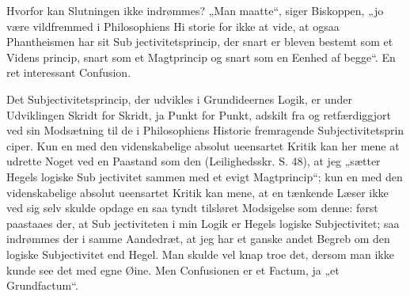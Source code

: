 \documentclass[12pt]{book}
\newcommand{\opage}[1]{\marginnote{\footnotesize\textit{[#1]}}}
\begin{document}
Hvorfor kan Slutningen ikke indrømmes? „Man maatte“,
siger Biskoppen, „jo være vildfremmed i Philosophiens Hi\-%
storie for ikke at vide, at ogsaa Phantheismen har sit Sub\-%
jectivitetsprincip, der snart er bleven bestemt som et Videns\-%
princip, snart som et Magtprincip og snart som en Eenhed
af begge“. En ret interessant Confusion.

Det Subjectivitetsprincip, der udvikles i Grundideernes
Logik, er under Udviklingen Skridt for Skridt, ja Punkt for
Punkt, adskilt fra og retfærdiggjort ved sin Modsætning til
de i Philosophiens Historie fremragende Subjectivitetsprin\-%
ciper. Kun en med den videnskabelige absolut ueensartet
Kritik kan her mene at udrette Noget ved en Paastand som
den (Leilighedsskr. S. 48), at jeg „sætter Hegels logiske Sub\-%
jectivitet sammen med et evigt Magtprincip“; kun en med
den videnskabelige absolut ueensartet Kritik kan mene, at en
tænkende Læser ikke ved sig selv skulde opdage en saa tyndt
tilsløret Modsigelse som denne: først paastaaes der, at Sub\-%
jectiviteten i min Logik er Hegels logiske Subjectivitet; saa
indrømmes der i samme Aandedræt, at jeg har et ganske
andet Begreb om den logiske Subjectivitet end Hegel. Man
skulde vel knap troe det, dersom man ikke kunde see det med
\opage{120}\setcounter{footnote}{0}%
egne Øine. Men Confusionen er et Factum, ja „et
Grundfactum“.
\end{document}
